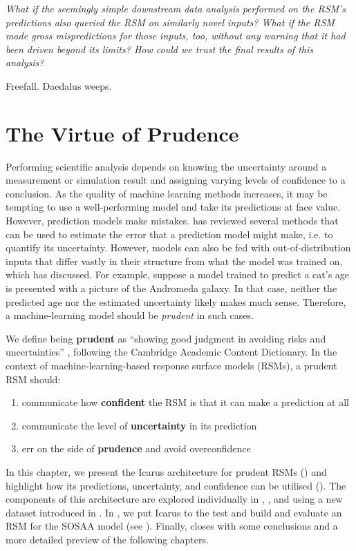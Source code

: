 {\selectfont
\newpar \textit{What if the seemingly simple downstream data analysis performed on the RSM's predictions also queried the RSM on similarly novel inputs? What if the RSM made gross mispredictions for those inputs, too, without any warning that it had been driven beyond its limits? How could we trust the final results of this analysis?}

\newpar Freefall. Daedalus weeps.
}

\section{The Virtue of Prudence} \label{txt:prudent-rsm}

Performing scientific analysis depends on knowing the uncertainty around a measurement or simulation result and assigning varying levels of confidence to a conclusion. As the quality of machine learning methods increases, it may be tempting to use a well-performing model and take its predictions at face value. However, prediction models make mistakes.  has reviewed several methods that can be used to estimate the error that a prediction model might make, i.e. to quantify its uncertainty. However, models can also be fed with out-of-distribution inputs that differ vastly in their structure from what the model was trained on, which  has discussed. For example, suppose a model trained to predict a cat's age is presented with a picture of the Andromeda galaxy. In that case, neither the predicted age nor the estimated uncertainty likely makes much sense. Therefore, a machine-learning model should be \textit{prudent} in such cases.

\newpar We define being \textbf{prudent} as ``showing good judgment in avoiding risks and uncertainties'' \cite{prudent-dictionary-2023}, following the Cambridge Academic Content Dictionary. In the context of machine-learning-based response surface models (RSMs), a prudent RSM should:
\begin{enumerate}
    \item communicate how \textbf{confident} the RSM is that it can make a prediction at all
    \item communicate the level of \textbf{uncertainty} in its prediction
    \item err on the side of \textbf{prudence} and avoid overconfidence
\end{enumerate}
\noindent In this chapter, we present the Icarus architecture for prudent RSMs () and highlight how its predictions, uncertainty, and confidence can be utilised (). The components of this architecture are explored individually in , , and  using a new dataset introduced in . In , we put Icarus to the test and build and evaluate an RSM for the SOSAA model (see ). Finally,  closes with some conclusions and a more detailed preview of the following chapters.

